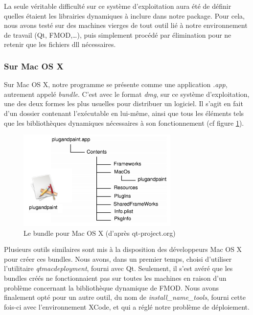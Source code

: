 \documentclass[a4paper,11pt]{article}
\begin{document}
La seule véritable difficulté sur ce système d'exploitation aura été de définir quelles étaient les librairies dynamiques à inclure dans notre package. Pour cela, nous avons testé sur des machines vierges de tout outil lié à notre environnement de travail (Qt, FMOD,\dots), puis simplement procédé par élimination pour ne retenir que les fichiers dll nécessaires.

\subsubsection{Sur Mac OS X}

Sur Mac OS X, notre programme se présente comme une application \textit{.app}, autrement appelé \textit{bundle}. C'est avec le format \textit{dmg}, sur ce système d'exploitation, une des deux formes les plus usuelles pour distribuer un logiciel. Il s'agit en fait d'un dossier contenant l'exécutable en lui-même, ainsi que tous les éléments tels que les bibliothèques dynamiques nécessaires à son fonctionnement (cf figure \ref{app_mac_os}).

\begin{figure}[H]
\begin{center}
\includegraphics[width=300px]{bundle_mac.png}
\caption{Le bundle pour Mac OS X (d'après qt-project.org)}
\label{app_mac_os}
\end{center}
\end{figure}

Plusieurs outils similaires sont mis à la disposition des développeurs Mac OS X pour créer ces bundles. Nous avons, dans un premier temps, choisi d'utiliser l'utilitaire \textit{qtmacdeployment}, fourni avec Qt. Seulement, il s'est avéré que les bundles créés ne fonctionnaient pas sur toutes les machines en raison d'un problème concernant la bibliothèque dynamique de FMOD. Nous avons finalement opté pour un autre outil, du nom de \textit{install\_name\_tools}, fourni cette fois-ci avec l'environnement XCode, et qui a réglé notre problème de déploiement.
\end{document}
